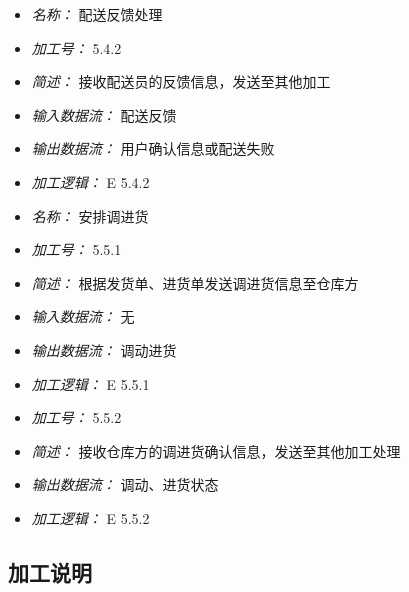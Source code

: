 \vspace{-1mm}


\begin{itemize}
\item \textit{名称： }配送反馈处理
\item \textit{加工号： }5.4.2
\item \textit{简述： } 接收配送员的反馈信息，发送至其他加工 
\item \textit{输入数据流： } 配送反馈
\item \textit{输出数据流： } 用户确认信息或配送失败 
\item \textit{加工逻辑： } E 5.4.2

\end{itemize}


\vspace{-1mm}


\begin{itemize}
\item \textit{名称： }安排调进货
\item \textit{加工号： }5.5.1
\item \textit{简述： } 根据发货单、进货单发送调进货信息至仓库方 
\item \textit{输入数据流： } 无
\item \textit{输出数据流： } 调动进货
\item \textit{加工逻辑： } E 5.5.1

\end{itemize}


\vspace{-1mm}


\begin{itemize}
\item \textit{加工号： }5.5.2
\item \textit{简述： } 接收仓库方的调进货确认信息，发送至其他加工处理 
\item \textit{输出数据流： } 调动、进货状态
\item \textit{加工逻辑： } E 5.5.2

\end{itemize}


\vspace{-1mm}

\subsection{加工说明}
